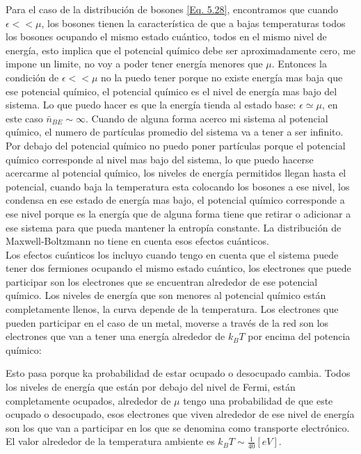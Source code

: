 \documentclass[11pt,fleqn]{book}
\begin{document}
Para el caso de la distribución de bosones \ref{Eq. 5.28}, encontramos que cuando $\epsilon<<\mu$, los bosones tienen la característica de que a bajas temperaturas todos los bosones ocupando el mismo estado cuántico, todos en el mismo nivel de energía, esto implica que el potencial químico debe ser aproximadamente cero, me impone un limite, no voy a poder tener energía menores que $\mu$. Entonces la condición de $\epsilon<<\mu$ no la puedo tener porque no existe energía mas baja que ese potencial químico, el potencial químico es el nivel de energía mas bajo del  sistema. Lo que puedo hacer es que la energía tienda al estado base: $\epsilon\simeq\mu$, en este caso $\bar{n}_{BE}\sim\infty$. Cuando de alguna forma acerco mi sistema al potencial químico, el numero de partículas promedio del sistema va a tener a ser infinito. Por debajo del potencial químico no puedo poner partículas porque el potencial químico corresponde al nivel mas bajo del sistema, lo que puedo hacerse acercarme al potencial químico, los niveles de energía permitidos llegan hasta el potencial, cuando baja la temperatura esta colocando los bosones a ese nivel, los condensa en ese estado de energía mas bajo, el potencial químico corresponde a ese nivel porque es la energía que de alguna forma tiene que retirar o adicionar a ese sistema para que pueda mantener la entropía constante. La distribución de Maxwell-Boltzmann no tiene en cuenta esos efectos cuánticos.\\

Los efectos cuánticos los incluyo cuando tengo en cuenta que el sistema puede tener dos fermiones ocupando el mismo estado cuántico, los electrones que puede participar son los electrones que se encuentran alrededor de ese potencial químico. Los niveles de energía que son menores al potencial químico están completamente llenos, la curva depende de la temperatura. Los electrones que pueden participar en el caso de un metal, moverse a través de la red son los electrones que van a tener una energía alrededor de $k_{B}T$ por encima del potencia químico:


Esto pasa porque ka probabilidad de estar ocupado o desocupado cambia. Todos los niveles de energía que están por debajo del nivel de Fermi, están completamente ocupados, alrededor de $\mu$ tengo una probabilidad de que este ocupado o desocupado, esos electrones que viven alrededor de ese nivel de energía son los que van a participar en los que se denomina como transporte electrónico. El valor alrededor de la temperatura ambiente es $k_{B}T\sim\frac{1}{40}[eV]$.\\
\end{document}
